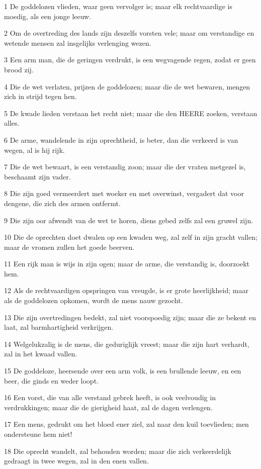 \par 1 De goddelozen vlieden, waar geen vervolger is; maar elk rechtvaardige is moedig, als een jonge leeuw.
\par 2 Om de overtreding des lands zijn deszelfs vorsten vele; maar om verstandige en wetende mensen zal insgelijks verlenging wezen.
\par 3 Een arm man, die de geringen verdrukt, is een wegvagende regen, zodat er geen brood zij.
\par 4 Die de wet verlaten, prijzen de goddelozen; maar die de wet bewaren, mengen zich in strijd tegen hen.
\par 5 De kwade lieden verstaan het recht niet; maar die den HEERE zoeken, verstaan alles.
\par 6 De arme, wandelende in zijn oprechtheid, is beter, dan die verkeerd is van wegen, al is hij rijk.
\par 7 Die de wet bewaart, is een verstandig zoon; maar die der vraten metgezel is, beschaamt zijn vader.
\par 8 Die zijn goed vermeerdert met woeker en met overwinst, vergadert dat voor dengene, die zich des armen ontfermt.
\par 9 Die zijn oor afwendt van de wet te horen, diens gebed zelfs zal een gruwel zijn.
\par 10 Die de oprechten doet dwalen op een kwaden weg, zal zelf in zijn gracht vallen; maar de vromen zullen het goede beerven.
\par 11 Een rijk man is wijs in zijn ogen; maar de arme, die verstandig is, doorzoekt hem.
\par 12 Als de rechtvaardigen opspringen van vreugde, is er grote heerlijkheid; maar als de goddelozen opkomen, wordt de mens nauw gezocht.
\par 13 Die zijn overtredingen bedekt, zal niet voorspoedig zijn; maar die ze bekent en laat, zal barmhartigheid verkrijgen.
\par 14 Welgelukzalig is de mens, die geduriglijk vreest; maar die zijn hart verhardt, zal in het kwaad vallen.
\par 15 De goddeloze, heersende over een arm volk, is een brullende leeuw, en een beer, die ginds en weder loopt.
\par 16 Een vorst, die van alle verstand gebrek heeft, is ook veelvoudig in verdrukkingen; maar die de gierigheid haat, zal de dagen verlengen.
\par 17 Een mens, gedrukt om het bloed ener ziel, zal naar den kuil toevlieden; men ondersteune hem niet!
\par 18 Die oprecht wandelt, zal behouden worden; maar die zich verkeerdelijk gedraagt in twee wegen, zal in den enen vallen.
